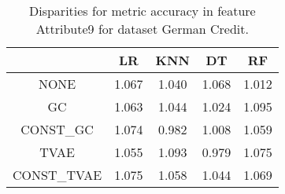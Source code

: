 \begin{table}
\caption{Disparities for metric accuracy in feature Attribute9 for dataset German Credit.}
\label{tab:disp-GERMAN CREDIT-Attribute9-accuracy}
\begin{tabular}{ccccc}
\toprule
 & LR & KNN & DT & RF \\
\midrule
NONE & 1.067 & 1.040 & 1.068 & 1.012 \\
GC & 1.063 & 1.044 & 1.024 & 1.095 \\
CONST\_GC & 1.074 & 0.982 & 1.008 & 1.059 \\
TVAE & 1.055 & 1.093 & 0.979 & 1.075 \\
CONST\_TVAE & 1.075 & 1.058 & 1.044 & 1.069 \\
\bottomrule
\end{tabular}
\end{table}

